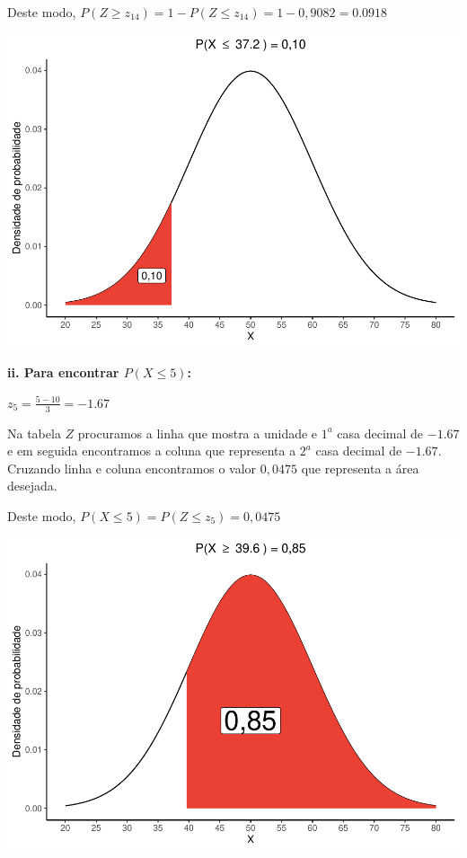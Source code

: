 \documentclass[
]{book}
\begin{document}
Deste modo, \(P(Z \ge z_{14}) = 1 - P(Z \le z_{14}) = 1 - 0,9082 = 0.0918\)

\includegraphics{probest-cambientais_files/figure-latex/unnamed-chunk-86-1.pdf}

\textbf{ii. Para encontrar \(P(X \le 5)\):}

\(z_{5} = \frac{5 - 10}{3} = -1.67\)

Na tabela \(Z\) procuramos a linha que mostra a unidade e \(1^a\) casa decimal de \(-1.67\) e em seguida encontramos a coluna que representa a \(2^a\) casa decimal de \(-1.67\). Cruzando linha e coluna encontramos o valor \(0,0475\) que representa a área desejada.

Deste modo, \(P(X \le 5) = P(Z \le z_{5}) = 0,0475\)

\includegraphics{probest-cambientais_files/figure-latex/unnamed-chunk-87-1.pdf}
\end{document}
